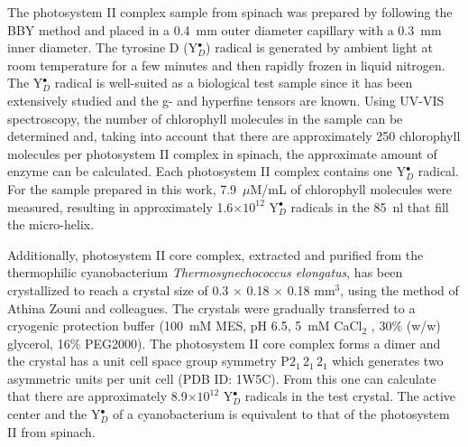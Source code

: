 The photosystem II complex sample from spinach was prepared by following the BBY method and placed in a 0.4~mm outer diameter capillary with a 0.3~mm inner diameter. \cite{BBY1981} The tyrosine D (Y$_D^\bullet$) radical is generated by ambient light at room temperature for a few minutes and then rapidly frozen in liquid nitrogen. The Y$_D^\bullet$ radical is well-suited as a biological test sample since it has been extensively studied and the g- and hyperfine tensors are known. \cite{Hofbauer6623} Using UV-VIS spectroscopy, the number of chlorophyll molecules in the sample can be determined and, taking into account that there are approximately 250 chlorophyll molecules per photosystem II complex in spinach, the approximate amount of enzyme can be calculated. Each photosystem II complex contains one Y$_D^\bullet$ radical. For the sample prepared in this work, 7.9~$\mu$M/mL of chlorophyll molecules were measured, resulting in approximately 1.6$\times10^{12}$ Y$_D^\bullet$ radicals in the 85~nl that fill the micro-helix. 

Additionally, photosystem II core complex, extracted and purified from the thermophilic cyanobacterium {\em Thermosynechococcus elongatus}, has been crystallized to reach a crystal size of 0.3 $\times$ 0.18 $\times$ 0.18 mm$^3$, using the method of Athina Zouni and colleagues. \cite{KERN2005147} The crystals were gradually transferred to a cryogenic protection buffer (100~mM MES, pH 6.5, 5~mM CaCl$_2$ , 30\% (w/w) glycerol, 16\% PEG2000). The photosystem II core complex forms a dimer and the crystal has a unit cell space group symmetry P${2_1\,2_1\,2_1}$ which generates two asymmetric units per unit cell (PDB ID: 1W5C). From this one can calculate that there are approximately 8.9$\times10^{12}$ Y$_D^\bullet$ radicals in the test crystal. The active center and the Y$_D^\bullet$ of a cyanobacterium is equivalent to that of the photosystem II from spinach. 

